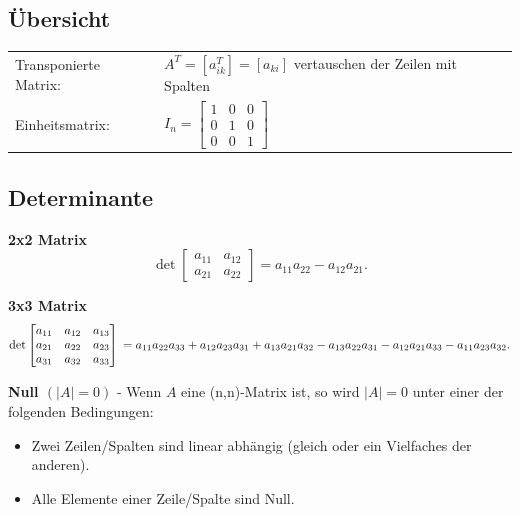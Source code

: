 	
	
	
\subsection{Übersicht}
	\begin{tabular}{l l}
    	Transponierte Matrix: & $A^T=[a_{ik}^T]=[a_{ki}]$ vertauschen der Zeilen
    	mit Spalten\\
    	Einheitsmatrix:& $I_n= 
			    	\begin{bmatrix} 
			        	1&0 & 0\\
			        	0&1&0\\
			        	0&0&1                               
			        \end{bmatrix}$		    
    \end{tabular}

\subsection{Determinante}

	\textbf{2x2 Matrix}    
	$$ \det \begin{bmatrix} a_{11} & a_{12} \\ a_{21} & a_{22} \end{bmatrix} =
	a_{11} a_{22} - a_{12} a_{21}.  $$
	
	\textbf{3x3 Matrix}
	$$ \det \begin{bmatrix} a_{11} & a_{12} & a_{13} \\ a_{21} & a_{22}& a_{23} \\
	a_{31} & a_{32} & a_{33} \end{bmatrix} \\ = a_{11} a_{22} a_{33} + a_{12}
	a_{23} a_{31} + a_{13} a_{21} a_{32} - a_{13} a_{22} a_{31} - a_{12} a_{21}
	a_{33} - a_{11} a_{23} a_{32}.  $$
	
% 	
	\textbf{Null $(|A| = 0)$} - Wenn $A$ eine (n,n)-Matrix ist, so wird $|A| = 0$ unter einer der
	folgenden Bedingungen:
	\begin{itemize}
    	\item Zwei Zeilen/Spalten sind linear abhängig (gleich oder ein Vielfaches der anderen).
    	\item Alle Elemente einer Zeile/Spalte sind Null. \\
  	\end{itemize} 
	
